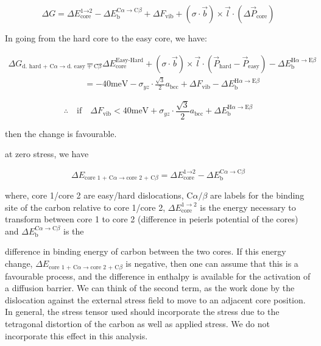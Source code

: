 \documentclass[a4paper,11pt]{article}
\begin{document}
\begin{equation}
 \Delta G
   =  \Delta E_{\text{core}}^{\text{1} \rightarrow \text{2}}
       - \Delta E_{\text{b}}^{\text{C}\alpha \rightarrow \text{C}\beta}
       + \Delta F_{\text{vib} }
       + (\sigma \cdot \vec{b}) \times \vec{l}  \cdot ( \Delta\vec{P}_{\text{core}} )
\end{equation}

In going from the hard core to the easy core, we have:

    \begin{align}
     \Delta G_{ \text{d. hard + C}\alpha \rightarrow \text{d. easy + C}\beta }
       &=   - \Delta E_{\text{core}}^{\text{Easy-Hard}}
    	   + (\sigma \cdot \vec{b}) \times \vec{l}  \cdot ( \vec{P}_{\text{hard}} - \vec{P}_{\text{easy}} )
       - \Delta E_{\text{b}}^{\text{H}\alpha \rightarrow \text{E}\beta}\\
&= - 40\text{meV} - \sigma_{yz} \cdot \frac{\sqrt{3}}{2} a_{\text{bcc} } + \Delta F_{\text{vib} } - \Delta E_{\text{b}}^{\text{H}\alpha \rightarrow \text{E}\beta}
    \end{align}

\[ \therefore \quad \text{if}\quad \Delta F_{\text{vib} } < 40 \text{meV} + \sigma_{yz} \cdot \frac{\sqrt{3}}{2} a_{\text{bcc} } + \Delta E_{\text{b}}^{\text{H}\alpha \rightarrow \text{E}\beta} \]

then the change is favourable. 


at zero stress, we have

\begin{equation}
 \Delta E_{ \text{core 1 + C}\alpha \rightarrow \text{core 2 + C}\beta }
   =  \Delta E_{\text{core}}^{\text{1} \rightarrow \text{2}} - \Delta E_{\text{b}}^{\text{C}\alpha \rightarrow \text{C}\beta}
\end{equation}


where, core 1/core 2 are easy/hard dislocations, \(\text{C}\alpha/\beta\) are labels for the
binding site of the carbon relative to core 1/core 2, \(\Delta E^{1\rightarrow 2}_{\text{core}}\)
is the energy necessary to transform between core 1 to core 2 (difference in peierls potential
of the cores) and \(\Delta E_{\text{b}}^{\text{C}\alpha \rightarrow \text{C}\beta}\) is the

difference in binding energy of carbon between the two cores. If this energy change, \(\Delta E_{
    \text{core 1 + C}\alpha \rightarrow \text{core 2 + C}\beta }\) is negative, then one can assume
that this is a favourable process, and the difference in enthalpy is available for the activation of a
diffusion barrier. We can think of the second term, as the work done by the dislocation against
the external stress field to move to an adjacent core position. In general, the stress tensor
used should incorporate the stress due to the tetragonal distortion of the carbon as well as
applied stress. We do not incorporate this effect in this analysis.
\end{document}
